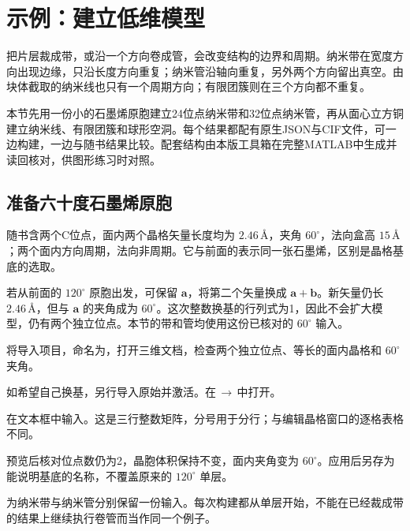 \section{示例：建立低维模型}\label{sec:nanostructure-examples}

把片层裁成带，或沿一个方向卷成管，会改变结构的边界和周期。纳米带在宽度方向出现边缘，只沿长度方向重复；纳米管沿轴向重复，另外两个方向留出真空。由块体截取的纳米线也只有一个周期方向；有限团簇则在三个方向都不重复。

本节先用一份小的石墨烯原胞建立24位点纳米带和32位点纳米管，再从面心立方铜建立纳米线、有限团簇和球形空洞。每个结果都配有原生JSON与CIF文件，可一边构建，一边与随书结果比较。配套结构由本版工具箱在完整MATLAB\regmark{}中生成并读回核对，供图形练习时对照。

\subsection{准备六十度石墨烯原胞}

随书含两个C位点，面内两个晶格矢量长度均为 $2.46\,\text{\AA}$，夹角 $60^\circ$，法向盒高 $15\,\text{\AA}$；两个面内方向周期，法向非周期。它与前面的表示同一张石墨烯，区别是晶格基底的选取。

若从前面的 $120^\circ$ 原胞出发，可保留 $\mathbf a$，将第二个矢量换成 $\mathbf a+\mathbf b$。新矢量仍长 $2.46\,\text{\AA}$，但与 $\mathbf a$ 的夹角成为 $60^\circ$。这次整数换基的行列式为1，因此不会扩大模型，仍有两个独立位点。本节的带和管均使用这份已核对的 $60^\circ$ 输入。

\begin{steps}
  \item 将导入项目，命名为，打开三维文档，检查两个独立位点、等长的面内晶格和 $60^\circ$ 夹角。
  \item 如希望自己换基，另行导入原始并激活。在\,$\rightarrow$\,中打开。
  \item 在文本框中输入。这是三行整数矩阵，分号用于分行；与编辑晶格窗口的逐格表格不同。
  \item 预览后核对位点数仍为2，晶胞体积保持不变，面内夹角变为 $60^\circ$。应用后另存为能说明基底的名称，不覆盖原来的 $120^\circ$ 单层。
  \item 为纳米带与纳米管分别保留一份输入。每次构建都从单层开始，不能在已经裁成带的结果上继续执行卷管而当作同一个例子。
\end{steps}

